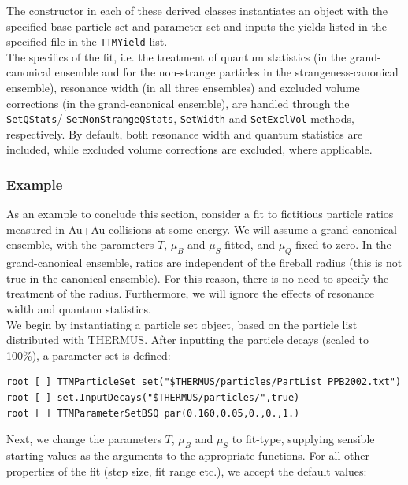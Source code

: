 \documentclass{elsarticle}
\begin{document}
The constructor in each of these derived classes instantiates an object with 
the specified base particle set and parameter set and inputs the 
yields listed in the specified file in the \texttt{TTMYield} list.\\

The specifics of the fit, i.e. the treatment of quantum statistics (in the 
grand-canonical ensemble and for the non-strange particles in the 
strangeness-canonical ensemble), resonance width (in all three ensembles) 
and excluded volume corrections (in the grand-canonical ensemble), are 
handled through the \texttt{SetQStats}/ \texttt{SetNonStrangeQStats}, 
\texttt{SetWidth} and 
\texttt{SetExclVol} methods, respectively. By default, both resonance width and quantum statistics are included, 
while excluded volume corrections are excluded, where applicable.\\

\subsubsection{Example}

As an example to conclude this section, consider a fit to fictitious particle ratios measured in Au+Au collisions at some 
energy. We will assume a grand-canonical ensemble, with the  
parameters $T$, $\mu_B$ and $\mu_S$ fitted, and $\mu_Q$ fixed to zero. In the grand-canonical 
ensemble, ratios are independent of the fireball radius (this is not true in the 
canonical ensemble). For this reason, there is no need to specify the treatment of the radius. 
Furthermore, we will ignore the effects of resonance width and quantum statistics.\\ 

We begin by instantiating a particle set object, based on the particle list 
distributed with THERMUS. After inputting the particle decays 
(scaled to 100\%), a parameter set is defined:

\small
\begin{verbatim}
root [ ] TTMParticleSet set("$THERMUS/particles/PartList_PPB2002.txt")
root [ ] set.InputDecays("$THERMUS/particles/",true)
root [ ] TTMParameterSetBSQ par(0.160,0.05,0.,0.,1.)
\end{verbatim}
\normalsize

\noindent
Next, we change the parameters $T$, $\mu_B$ and $\mu_S$ to fit-type, supplying sensible starting values as 
the arguments to the appropriate functions. For all other properties of the fit (step size, fit 
range etc.), we accept the default values:
\end{document}
